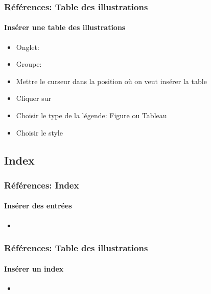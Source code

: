 \documentclass[xcolor=table]{beamer}
\begin{document}
\begin{frame}[t]
\frametitle{Références: Table des illustrations}
\framesubtitle{Insérer une table des illustrations}

\begin{minipage}{0.61\textwidth}
	\begin{itemize}
		\item Onglet: 
		\item Groupe: 
		\item Mettre le curseur dans la position où on veut insérer la table
		\item Cliquer sur 
		\item Choisir le type de la légende: Figure ou Tableau
		\item Choisir le style
	\end{itemize}
\end{minipage}
\begin{minipage}{0.38\textwidth}
	
	
\end{minipage}

\end{frame}

\subsection{Index}

\begin{frame}[t]
\frametitle{Références: Index}
\framesubtitle{Insérer des entrées}

\begin{minipage}{0.61\textwidth}
\begin{itemize}
	\item 
\end{itemize}
\end{minipage}
\begin{minipage}{0.38\textwidth}


\end{minipage}

\end{frame}

\begin{frame}[t]
\frametitle{Références: Table des illustrations}
\framesubtitle{Insérer un index}

\begin{minipage}{0.61\textwidth}
\begin{itemize}
\item 
\end{itemize}
\end{minipage}
\begin{minipage}{0.38\textwidth}


\end{minipage}

\end{frame}
\end{document}

